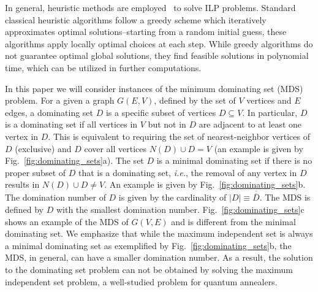 \documentclass[10pt]{iopart}
\begin{document}
In general, heuristic methods are employed~\cite{GLOVER1986533, doi:10.1287/ijoc.1.3.190, doi:10.1287/ijoc.2.1.4} to solve ILP problems.
Standard classical heuristic algorithms follow a greedy scheme which iteratively approximates optimal solutions--starting from a random initial guess, these algorithms apply locally optimal choices at each step.
While greedy algorithms do not guarantee optimal global solutions, they find feasible solutions in polynomial time, which can be utilized in further computations.

In this paper we will consider instances of the minimum dominating set (MDS) problem.  For a given a graph $G(E,V)$, defined by the set of $V$ vertices and $E$ edges, a dominating set $D$ is a specific subset of vertices $D \subseteq V$.
In particular, $D$ is a dominating set if all vertices in $V$ but not in $D$ are adjacent to at least one vertex in $D$.
This is equivalent to requiring the set of nearest-neighbor vertices of $D$ (exclusive) and $D$ cover all vertices $N(D) \cup D = V$ (an example is given by Fig.~\ref{fig:dominating_sets}a).
The set $D$ is a minimal dominating set if there is no proper subset of $D$ that is a dominating set, {\it{i.e.}}, the removal of any vertex in $D$ results in $N(D) \cup D  \neq V$.
An example is given by Fig.~\ref{fig:dominating_sets}b.
The domination number of $D$ is given by the cardinality of $|D| \equiv \overline{\overline{D}}$.
The MDS is defined by $D$ with the smallest domination number.
Fig.~\ref{fig:dominating_sets}c shows an example of the MDS of $G(V, E)$ and is different from the minimal dominating set.
We emphasize that while the maximum independent set is always a minimal dominating set as exemplified by Fig.~\ref{fig:dominating_sets}b, the MDS, in general, can have a smaller domination number.
As a result, the solution to the dominating set problem can not be obtained by solving the maximum independent set problem, a well-studied problem for quantum annealers.
\end{document}
